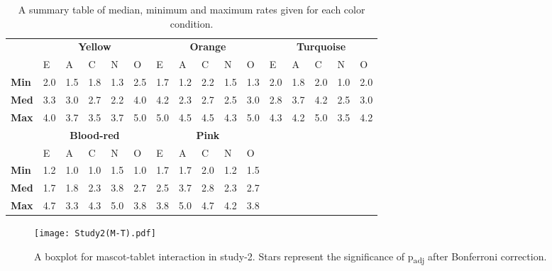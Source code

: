 \begin{table}[!htb]
    \renewcommand{\arraystretch}{1}
    \begin{center}
        \begin{tabular}{p{}|
        p{}|p{}|p{}|p{}|p{}||
        p{}|p{}|p{}|p{}|p{}||
        p{}|p{}|p{}|p{}|p{}|}
            \cline{2-16}
            & \multicolumn{5}{c||}{\textbf{Yellow}} & \multicolumn{5}{c||}{\textbf{Orange}}
            & \multicolumn{5}{c|}{\textbf{Turquoise}} \\
            \cline{2-16}
            & E & A & C & N & O & E & A & C & N & O & E & A & C & N & O      \\
            \cline{2-16}
            \textbf{Min}    & 2.0 & 1.5 & 1.8 & 1.3 & 2.5 & 1.7 & 1.2 & 2.2 & 1.5 & 1.3 & 2.0 & 1.8 & 2.0 & 1.0 & 2.0  \\
            \textbf{Med}    & 3.3 & 3.0 & 2.7 & 2.2 & 4.0 & 4.2 & 2.3 & 2.7 & 2.5 & 3.0 & 2.8 & 3.7 & 4.2 & 2.5 & 3.0  \\
            \textbf{Max}    & 4.0 & 3.7 & 3.5 & 3.7 & 5.0 & 5.0 & 4.5 & 4.5 & 4.3 & 5.0 & 4.3 & 4.2 & 5.0 & 3.5 & 4.2 \\
            \cline{2-16}
            \cline{2-11}
            &  \multicolumn{5}{|c||}{\textbf{Blood-red}} & \multicolumn{5}{|c||}{\textbf{Pink}} \\
            \cline{2-11}
            & E & A & C & N & O & E & A & C & N & O            \\
            \cline{2-11}
            \textbf{Min}    & 1.2 & 1.0 & 1.0 & 1.5 & 1.0 & 1.7 & 1.7 & 2.0 & 1.2 & 1.5    \\
            \textbf{Med}    & 1.7 & 1.8 & 2.3 & 3.8 & 2.7 & 2.5 & 3.7 & 2.8 & 2.3 & 2.7    \\
            \textbf{Max}    & 4.7 & 3.3 & 4.3 & 5.0 & 3.8 & 3.8 & 5.0 & 4.7 & 4.2 & 3.8    \\
            \cline{2-11}
        \end{tabular}
        \caption[]{A summary table of median, minimum and maximum rates given for each color condition.\footnotemark}
        \label{table:medianMT2}
    \end{center}
\end{table}

\begin{figure}[!htb]
    \centering
    \texttt{[image: Study2(M-T).pdf]}
    \caption[]{A boxplot for mascot-tablet interaction in study-2.
    Stars represent the significance of p\textsubscript{adj} after Bonferroni correction.\footnotemark}
    \label{fig:MT2}
\end{figure}
